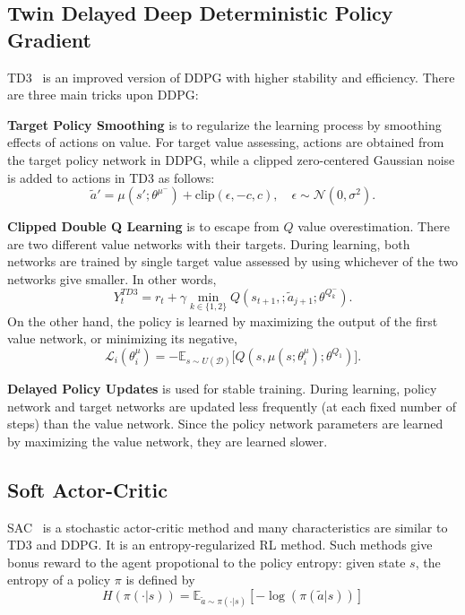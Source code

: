 \documentclass[a4paper, 12pt]{article} %
\begin{document}
\subsection{Twin Delayed Deep Deterministic Policy Gradient}
TD3~\cite{fujimoto_addressing_2018} is an improved version of DDPG with higher stability and efficiency. 
There are three main tricks upon DDPG: 

\textbf{Target Policy Smoothing} is to regularize the learning process by smoothing effects of actions on value. For target value assessing, actions are obtained from the target policy network in DDPG, while a clipped zero-centered Gaussian noise is added to actions in TD3 as follows: 
\begin{equation}
\label{eqn:td3_target_action}
\widetilde{a}' = \mu(s';\theta^{\mu^-}) + \text{clip}(\epsilon, -c, c), \quad \epsilon \sim \mathcal{N}(0, \sigma^2).
\end{equation}

\textbf{Clipped Double Q Learning} is to escape from $Q$ value overestimation. 
There are two different value networks with their targets. 
During learning, both networks are trained by single target value assessed by using whichever of the two networks give smaller. 
In other words, 
\begin{equation}
\label{eqn:td3_target}
Y_t^{TD3} = r_t + \gamma \min_{k\in\{1,2\}} Q(s_{t+1}, ;\widetilde{a}_{j+1};\theta^{Q_k^-}).
\end{equation}
On the other hand, the policy is learned by maximizing the output of the first value network, or minimizing its negative,
\begin{equation}
\label{eqn:td3_policy_loss}
\mathcal{L}_i(\theta^\mu_i) = -\mathbb{E}_{s \sim U(\mathcal{D})} \Big[ Q(s, \mu(s;\theta^\mu_i);\theta^{Q_1}) \Big].
\end{equation} 

\textbf{Delayed Policy Updates} is used for stable training. 
During learning, policy network and target networks are updated less frequently (at each fixed number of steps) than the value network. 
Since the policy network parameters are learned by maximizing the value network, they are learned slower.  

\subsection{Soft Actor-Critic}
SAC~\cite{haarnoja_soft_2018} is a stochastic actor-critic method and many characteristics are similar to TD3 and DDPG. 
It is an entropy-regularized RL method. Such methods give bonus reward to the agent propotional to the policy entropy: given state $s$, the entropy of a policy $\pi$ is defined by
\begin{equation}
\label{eqn:policy_entropy}
H(\pi(\cdot|s)) = \mathbb{E}_{\widetilde{a}\sim\pi(\cdot|s)}[-\log(\pi(\widetilde{a}|s))]
\end{equation}
\end{document}
